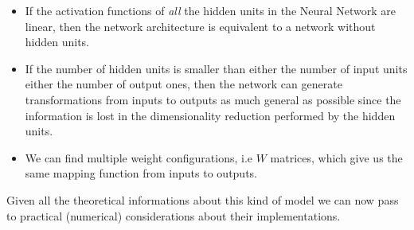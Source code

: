 \documentclass{standalone}
\begin{document}
\begin{itemize}

\item If the activation functions of \emph{all} the hidden units in the Neural Network are linear, then the network architecture is equivalent to a network without hidden units.

\item If the number of hidden units is smaller than either the number of input units either the number of output ones, then the network can generate transformations from inputs to outputs as much general as possible since the information is lost in the dimensionality reduction performed by the hidden units.

\item We can find multiple weight configurations, i.e $W$ matrices, which give us the same mapping function from inputs to outputs.

\end{itemize}

Given all the theoretical informations about this kind of model we can now pass to practical (numerical) considerations about their implementations.
\end{document}
